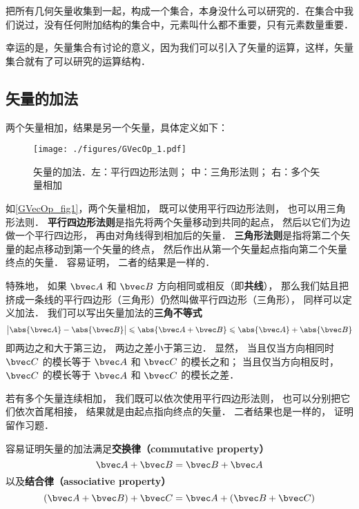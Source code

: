 

把所有几何矢量收集到一起，构成一个集合，本身没什么可以研究的．在集合中我们说过，没有任何附加结构的集合中，元素叫什么都不重要，只有元素数量重要．

幸运的是，矢量集合有讨论的意义，因为我们可以引入了矢量的运算，这样，矢量集合就有了可以研究的运算结构．

\subsection{矢量的加法}
两个矢量相加，结果是另一个矢量，具体定义如下：
\begin{figure}[ht]
\centering
\texttt{[image: ./figures/GVecOp\_1.pdf]}
\caption{矢量的加法．左：平行四边形法则； 中：三角形法则； 右：多个矢量相加} \label{GVecOp_fig1}
\end{figure}
如\autoref{GVecOp_fig1}，两个矢量相加， 既可以使用平行四边形法则， 也可以用三角形法则． \textbf{平行四边形法则}是指先将两个矢量移动到共同的起点， 然后以它们为边做一个平行四边形， 再由对角线得到相加后的矢量． \textbf{三角形法则}是指将第二个矢量的起点移动到第一个矢量的终点， 然后作出从第一个矢量起点指向第二个矢量终点的矢量． 容易证明， 二者的结果是一样的．

特殊地， 如果 $\bvec A$ 和 $\bvec B$ 方向相同或相反（即\textbf{共线}）， 那么我们姑且把挤成一条线的平行四边形（三角形）仍然叫做平行四边形（三角形）， 同样可以定义加法． 我们可以写出矢量加法的\textbf{三角不等式}
\begin{equation}
\big|\abs{\bvec A} - \abs{\bvec B}\big| \leqslant \abs{\bvec A + \bvec B} \leqslant \abs{\bvec A} + \abs{\bvec B}
\end{equation}
即两边之和大于第三边， 两边之差小于第三边． 显然， 当且仅当方向相同时 $\bvec C$ 的模长等于 $\bvec A$ 和 $\bvec C$ 的模长之和； 当且仅当方向相反时， $\bvec C$ 的模长等于 $\bvec A$ 和 $\bvec C$ 的模长之差． 

若有多个矢量连续相加， 我们既可以依次使用平行四边形法则， 也可以分别把它们依次首尾相接， 结果就是由起点指向终点的矢量． 二者结果也是一样的， 证明留作习题．

容易证明矢量的加法满足\textbf{交换律（commutative property）}
\begin{equation}
\bvec A + \bvec B = \bvec B + \bvec A
\end{equation}
以及\textbf{结合律（associative property）}
\begin{equation}
(\bvec A + \bvec B) + \bvec C = \bvec A + (\bvec B + \bvec C)
\end{equation}

